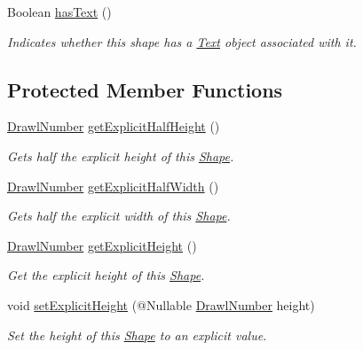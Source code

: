 \begin{DoxyCompactItemize}
Boolean \hyperlink{classcom_1_1aarrelaakso_1_1drawl_1_1_shape_a037a5515b2a6e1df1d1981aa5516e78e}{has\+Text} ()
\begin{DoxyCompactList}\small\item\em Indicates whether this shape has a \hyperlink{classcom_1_1aarrelaakso_1_1drawl_1_1_text}{Text} object associated with it. \end{DoxyCompactList}\end{DoxyCompactItemize}
\subsection*{Protected Member Functions}
\begin{DoxyCompactItemize}
\item 
\hyperlink{classcom_1_1aarrelaakso_1_1drawl_1_1_drawl_number}{Drawl\+Number} \hyperlink{classcom_1_1aarrelaakso_1_1drawl_1_1_shape_a7207aa8ba07ed18af81fb9d92a979cd6}{get\+Explicit\+Half\+Height} ()
\begin{DoxyCompactList}\small\item\em Gets half the explicit height of this \hyperlink{classcom_1_1aarrelaakso_1_1drawl_1_1_shape}{Shape}. \end{DoxyCompactList}\item 
\hyperlink{classcom_1_1aarrelaakso_1_1drawl_1_1_drawl_number}{Drawl\+Number} \hyperlink{classcom_1_1aarrelaakso_1_1drawl_1_1_shape_af952f32cb1706da71c9cb75916f4d665}{get\+Explicit\+Half\+Width} ()
\begin{DoxyCompactList}\small\item\em Gets half the explicit width of this \hyperlink{classcom_1_1aarrelaakso_1_1drawl_1_1_shape}{Shape}. \end{DoxyCompactList}\item 
\hyperlink{classcom_1_1aarrelaakso_1_1drawl_1_1_drawl_number}{Drawl\+Number} \hyperlink{classcom_1_1aarrelaakso_1_1drawl_1_1_shape_a76cd6b4d9f427f1888fc98fd653ee496}{get\+Explicit\+Height} ()
\begin{DoxyCompactList}\small\item\em Get the explicit height of this \hyperlink{classcom_1_1aarrelaakso_1_1drawl_1_1_shape}{Shape}. \end{DoxyCompactList}\item 
void \hyperlink{classcom_1_1aarrelaakso_1_1drawl_1_1_shape_ad3881ca048d83262948961f9f0ab23e3}{set\+Explicit\+Height} (@Nullable \hyperlink{classcom_1_1aarrelaakso_1_1drawl_1_1_drawl_number}{Drawl\+Number} height)
\begin{DoxyCompactList}\small\item\em Set the height of this \hyperlink{classcom_1_1aarrelaakso_1_1drawl_1_1_shape}{Shape} to an explicit value. \end{DoxyCompactList}\item 

\end{DoxyCompactItemize}
